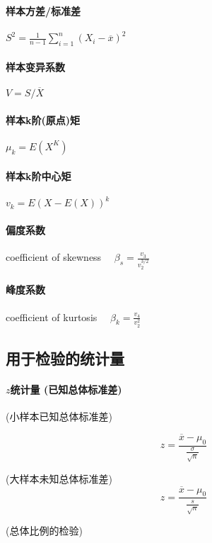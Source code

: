 \documentclass[UTF8,10pt]{book}
\begin{document}
            \paragraph{样本方差/标准差}  $ S^2 = \frac{1}{n-1}  \sum_{i=1}^n (X_i -\overline{x})^2 $

            \paragraph{样本变异系数}  $ V = S / \overline{X} $ 

            \paragraph{样本k阶(原点)矩}   $ \mu_k = E(X^K) $

            \paragraph{样本k阶中心矩}  $ v_k = E(X-E(X))^k $

            \paragraph{偏度系数} coefficient of skewness $\quad \beta_s = \frac{v_3}{v_2^{3/2}} $

            \paragraph{峰度系数} coefficient of kurtosis $\quad \beta_k = \frac{v_4}{v_2^2} $

        
        
        \subsection{用于检验的统计量}

            \paragraph{$z$统计量 (已知总体标准差)}

                (小样本已知总体标准差)

                $$z=\frac{\overline{x}-\mu_0}{\frac{\sigma}{\sqrt{n}}}$$

                (大样本未知总体标准差)$$z=\frac{\overline{x}-\mu_0}{\frac{s}{\sqrt{n}}}$$

                (总体比例的检验)
\end{document}
